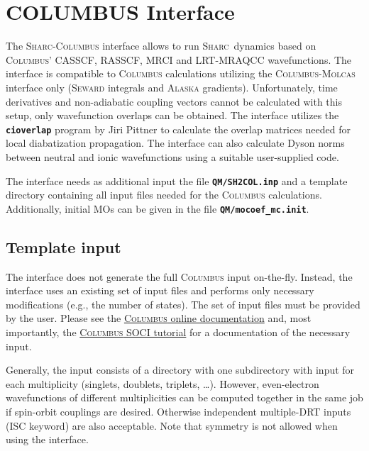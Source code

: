 \documentclass[a4paper,11pt,DIV=15,openany,twoside=false]{scrbook}
\newcommand{\sharc}{\textsc{Sharc}}
\newcommand{\ttt}[1]{\textbf{\texttt{#1}}}
\begin{document}

\section{COLUMBUS Interface}\label{sec:int:columbus}

The \sharc-\textsc{Columbus} interface allows to run \sharc\ dynamics based on \textsc{Columbus}' CASSCF, RASSCF, MRCI and LRT-MRAQCC wavefunctions. The interface is compatible to \textsc{Columbus} calculations utilizing the \textsc{Columbus}-\textsc{Molcas} interface only (\textsc{Seward} integrals and \textsc{Alaska} gradients). Unfortunately, time derivatives and non-adiabatic coupling vectors cannot be calculated with this setup, only wavefunction overlaps can be obtained. The interface utilizes the \ttt{cioverlap} program by Jiri Pittner \cite{Pittner2009CP} to calculate the overlap matrices needed for local diabatization propagation. The interface can also calculate Dyson norms between neutral and ionic wavefunctions using a suitable user-supplied code.

The interface needs as additional input the file \ttt{QM/SH2COL.inp} and a template directory containing all input files needed for the \textsc{Columbus} calculations. Additionally, initial MOs can be given in the file \ttt{QM/mocoef\_mc.init}.

\subsection{Template input}

The interface does not generate the full \textsc{Columbus} input on-the-fly. Instead, the interface uses an existing set of input files and performs only necessary modifications (e.g., the number of states). The set of input files must be provided by the user. Please see the \href{http://www.univie.ac.at/columbus/docs_COL70/documentation_main.html}{\textsc{Columbus} online documentation} and, most importantly, the 
\href{http://www.univie.ac.at/columbus/docs_COL70/tutorial-SO.pdf}{\textsc{Columbus} SOCI tutorial} for a documentation of the necessary input.

Generally, the input consists of a directory with one subdirectory with input for each multiplicity (singlets, doublets, triplets, \dots). However, even-electron wavefunctions of different multiplicities can be computed together in the same job if spin-orbit couplings are desired. Otherwise independent multiple-DRT inputs (ISC keyword) are also acceptable. Note that symmetry is not allowed when using the interface.
\end{document}
